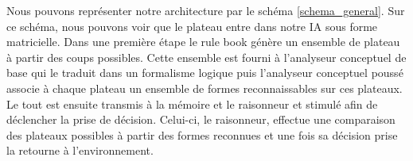 Nous pouvons représenter notre architecture par le schéma \ref{schema_general}. Sur ce schéma, nous pouvons voir que le plateau entre dans notre IA sous forme matricielle. Dans une première étape le \og rule book \fg{} génère un ensemble de plateau à partir des coups possibles. Cette ensemble est fourni à l'analyseur conceptuel de base qui le traduit dans un formalisme logique puis l'analyseur conceptuel poussé associe à chaque plateau un ensemble de formes reconnaissables sur ces plateaux. Le tout est ensuite transmis à la mémoire et le raisonneur et stimulé afin de déclencher la prise de décision. Celui-ci, le raisonneur, effectue une comparaison des plateaux possibles à partir des formes reconnues et une fois sa décision prise la retourne à l'environnement.
